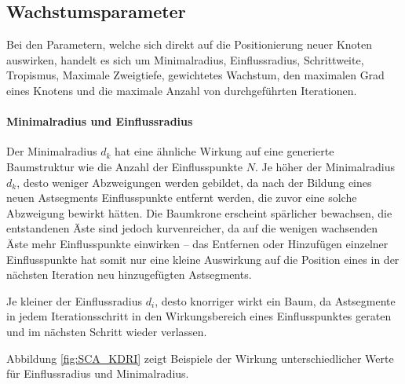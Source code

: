 \subsection{Wachstumsparameter}

Bei den Parametern, welche sich direkt auf die Positionierung neuer Knoten auswirken, handelt es sich um Minimalradius, Einflussradius, Schrittweite, Tropismus, Maximale Zweigtiefe, gewichtetes Wachstum, den maximalen Grad eines Knotens und die maximale Anzahl von durchgeführten Iterationen.

\paragraph{Minimalradius und Einflussradius}

Der Minimalradius $d_k$ hat eine ähnliche Wirkung auf eine generierte Baumstruktur wie die Anzahl der Einflusspunkte $N$. Je höher der Minimalradius $d_k$, desto weniger Abzweigungen werden gebildet, da nach der Bildung eines neuen Astsegments Einflusspunkte entfernt werden, die zuvor eine solche Abzweigung bewirkt hätten. Die Baumkrone erscheint spärlicher bewachsen, die entstandenen Äste sind jedoch kurvenreicher, da auf die wenigen wachsenden Äste mehr Einflusspunkte einwirken -- das Entfernen oder Hinzufügen einzelner Einflusspunkte hat somit nur eine kleine Auswirkung auf die Position eines in der nächsten Iteration neu hinzugefügten Astsegments. \cite[S.3]{SpaceColonizationAlgorithm:07}

Je kleiner der Einflussradius $d_i$, desto knorriger wirkt ein Baum, da Astsegmente in jedem Iterationsschritt in den Wirkungsbereich eines Einflusspunktes geraten und im nächsten Schritt wieder verlassen. \cite[S.4]{SpaceColonizationAlgorithm:07}

Abbildung \ref{fig:SCA_KDRI} zeigt Beispiele der Wirkung unterschiedlicher Werte für Einflussradius und Minimalradius.

